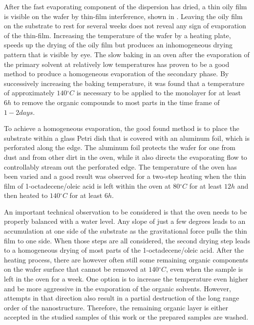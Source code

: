 \documentclass[\main/dresen_thesis.tex]{subfiles}
\begin{document}
    After the fast evaporating component of the dispersion has dried, a thin oily film is visible on the wafer by thin-film interference, shown in .
    Leaving the oily film on the substrate to rest for several weeks does not reveal any sign of evaporation of the thin-film.
    Increasing the temperature of the wafer by a heating plate, speeds up the drying of the oily film but produces an inhomogeneous drying pattern that is visible by eye.
    The slow baking in an oven after the evaporation of the primary solvent at relatively low temperatures has proven to be a good method to produce a homogeneous evaporation of the secondary phase.
    By successively increasing the baking temperature, it was found that a temperature of approximately $140 \unit{^\circ C}$ is necessary to be applied to the monolayer for at least $6 \unit{h}$ to remove the organic compounds to most parts in the time frame of $1 - 2 \unit{days}$.

    To achieve a homogeneous evaporation, the good found method is to place the substrate within a glass Petri dish that is covered with an aluminum foil, which is perforated along the edge.
    The aluminum foil protects the wafer for one from dust and from other dirt in the oven, while it also directs the evaporating flow to controllably stream out the perforated edge.
    The temperature of the oven has been varied and a good result was observed for a two-step heating when the thin film of 1-octadecene/oleic acid is left within the oven at $80 \unit{^\circ C}$ for at least $12\unit{h}$ and then heated to $140 \unit{^\circ C}$ for at least $6\unit{h}$.

    An important technical observation to be considered is that the oven needs to be properly balanced with a water level.
    Any slope of just a few degrees leads to an accumulation at one side of the substrate as the gravitational force pulls the thin film to one side.
    When those steps are all considered, the second drying step leads to a homogeneous drying of most parts of the 1-octadecene/oleic acid.
    After the heating process, there are however often still some remaining organic components on the wafer surface that cannot be removed at $140 \unit{^\circ C}$, even when the sample is left in the oven for a week.
    One option is to increase the temperature even higher and be more aggressive in the evaporation of the organic solvents.
    However, attempts in that direction also result in a partial destruction of the long range order of the nanostructure.
    Therefore, the remaining organic layer is either accepted in the studied samples of this work or the prepared samples are washed.
\end{document}
